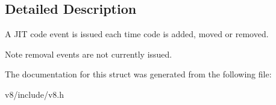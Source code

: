 \subsection{Detailed Description}
A J\+IT code event is issued each time code is added, moved or removed.

\begin{DoxyNote}{Note}
removal events are not currently issued. 
\end{DoxyNote}


The documentation for this struct was generated from the following file\+:\begin{DoxyCompactItemize}
\item 
v8/include/v8.\+h\end{DoxyCompactItemize}
